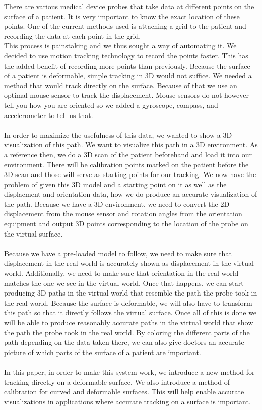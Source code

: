 There are various medical device probes that take data at different points on the surface of a patient. It is very important to know the exact location of these points. One of the current methods used is attaching a grid to the patient and recording the data at each point in the grid. 
\\
This process is painstaking and we thus sought a way of automating it. We decided to use motion tracking technology to record the points faster. This has the added benefit of recording more points than previously. Because the surface of a patient is deformable, simple tracking in 3D would not suffice. We needed a method that would track directly on the surface. Because of that we use an optimal mouse sensor to track the displacement. Mouse sensors do not however tell you how you are oriented so we added a gyroscope, compass, and accelerometer to tell us that. \\
\\
In order to maximize the usefulness of this data, we wanted to show a 3D visualization of this path. We want to visualize this path in a 3D environment. As a reference then, we do a 3D scan of the patient beforehand and load it into our environment. There will be calibration points marked on the patient before the 3D scan and those will serve as starting points for our tracking. We now have the problem of given this 3D model and a starting point on it as well as the displacment and orientation data, how we do produce an accurate visualization of the path. Because we have a 3D environment, we need to convert the 2D displacement from the mouse sensor and rotation angles from the orientation equipment and output 3D points corresponding to the location of the probe on the virtual surface. \\
\\
Because we have a pre-loaded model to follow, we need to make sure that displacement in the real world is accurately shown as displacement in the virtual world. Additionally, we need to make sure that orientation in the real world matches the one we see in the virtual world. Once that happens, we can start producing 3D paths in the virtual world that resemble the path the probe took in the real world. Because the surface is deformable, we will also have to transform this path so that it directly follows the virtual surface. Once all of this is done we will be able to produce reasonably accurate paths in the virtual world that show the path the probe took in the real world. By coloring the different parts of the path depending on the data taken there, we can also give doctors an accurate picture of which parts of the surface of a patient are important.\\
\\
In this paper, in order to make this system work, we introduce a new method for tracking directly on a deformable surface. We also introduce a method of calibration for curved and deformable surfaces. This will help enable accurate visualizations in applications where accurate tracking on a surface is important.